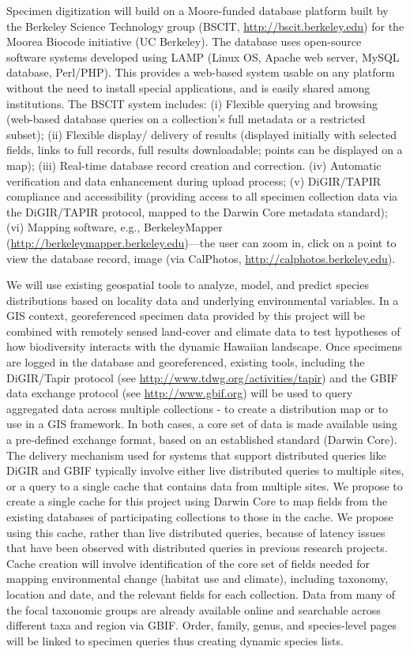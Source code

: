 \documentclass[11pt]{article}
\begin{document}
Specimen digitization will build on a Moore-funded database platform
built by the Berkeley Science Technology group (BSCIT,
\url{http://bscit.berkeley.edu}) for the Moorea Biocode initiative (UC
Berkeley). The database uses open-source software systems developed
using LAMP (Linux OS, Apache web server, MySQL database,
Perl/PHP). This provides a web-based system usable on any platform
without the need to install special applications, and is easily shared
among institutions. The BSCIT system includes: (i) Flexible querying
and browsing (web-based database queries on a collection’s full
metadata or a restricted subset); (ii) Flexible display/ delivery of
results (displayed initially with selected fields, links to full
records, full results downloadable; points can be displayed on a map);
(iii) Real-time database record creation and correction. (iv)
Automatic verification and data enhancement during upload process; (v)
DiGIR/TAPIR compliance and accessibility (providing access to all
specimen collection data via the DiGIR/TAPIR protocol, mapped to the
Darwin Core metadata standard); (vi) Mapping software, e.g.,
BerkeleyMapper (\url{http://berkeleymapper.berkeley.edu})---the user
can zoom in, click on a point to view the database record, image (via
CalPhotos, \url{http://calphotos.berkeley.edu}).

We will use existing geospatial tools to analyze, model, and predict
species distributions based on locality data and underlying
environmental variables. In a GIS context, georeferenced specimen data
provided by this project will be combined with remotely sensed
land-cover and climate data to test hypotheses of how biodiversity
interacts with the dynamic Hawaiian landscape. Once specimens are
logged in the database and georeferenced, existing tools, including
the DiGIR/Tapir protocol (see
\url{http://www.tdwg.org/activities/tapir}) and the GBIF data exchange
protocol (see \url{http://www.gbif.org}) will be used to query
aggregated data across multiple collections - to create a distribution
map or to use in a GIS framework. In both cases, a core set of data is
made available using a pre-defined exchange format, based on an
established standard (Darwin Core). The delivery mechanism used for
systems that support distributed queries like DiGIR and GBIF typically
involve either live distributed queries to multiple sites, or a query
to a single cache that contains data from multiple sites. We propose
to create a single cache for this project using Darwin Core to map
fields from the existing databases of participating collections to
those in the cache. We propose using this cache, rather than live
distributed queries, because of latency issues that have been observed
with distributed queries in previous research projects. Cache creation
will involve identification of the core set of fields needed for
mapping environmental change (habitat use and climate), including
taxonomy, location and date, and the relevant fields for each
collection. Data from many of the focal taxonomic groups are already
available online and searchable across different taxa and region via
GBIF. Order, family, genus, and species-level pages will be linked to
specimen queries thus creating dynamic species lists.
\end{document}
